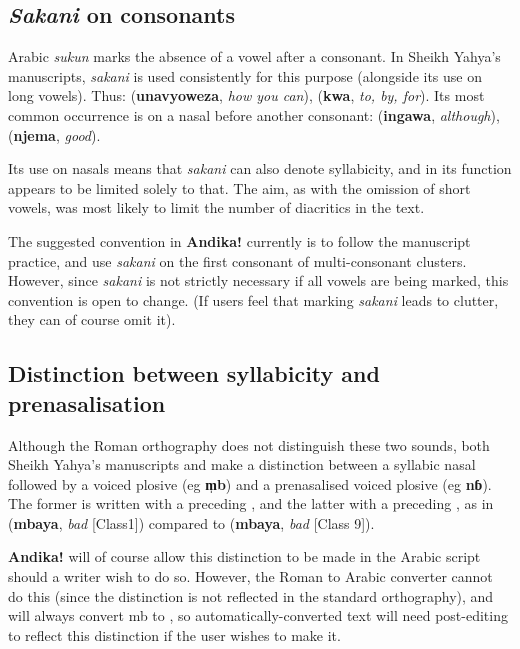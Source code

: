 \subsection{\textit{Sakani} on consonants}

Arabic \textit{sukun} marks the absence of a vowel after a consonant. In Sheikh Yahya's manuscripts, \textit{sakani} is used consistently for this purpose (alongside its use on long vowels). Thus:  (\textbf{unavyoweza}, \textit{how you can}),  (\textbf{kwa}, \textit{to, by, for}). Its most common occurrence is on a nasal before another consonant:  (\textbf{ingawa}, \textit{although}),  (\textbf{njema}, \textit{good}).

Its use on nasals means that \textit{sakani} can also denote syllabicity, and in \citet{Omar1997} its function appears to be limited solely to that. The aim, as with the omission of short vowels, was most likely to limit the number of diacritics in the text.

The suggested convention in \textbf{Andika!} currently is to follow the manuscript practice, and use \textit{sakani} on the first consonant of multi-consonant clusters. However, since \textit{sakani} is not strictly necessary if all vowels are being marked, this convention is open to change.  (If users feel that marking \textit{sakani} leads to clutter, they can of course omit it).

\subsection{Distinction between syllabicity and prenasalisation}

Although the Roman orthography does not distinguish these two sounds, both Sheikh Yahya's manuscripts and \citet{Omar1997} make a distinction between a syllabic nasal followed by a voiced plosive (eg \textbf{m̩b}) and a prenasalised voiced plosive (eg \textbf{nɓ}). The former is written with a preceding , and the latter with a preceding , as in  (\textbf{mbaya}, \textit{bad} [Class1]) compared to  (\textbf{mbaya}, \textit{bad} [Class 9]).

\textbf{Andika!} will of course allow this distinction to be made in the Arabic script should a writer wish to do so. However, the Roman to Arabic converter cannot do this (since the distinction is not reflected in the standard orthography), and will always convert mb to , so automatically-converted text will need post-editing to reflect this distinction if the user wishes to make it.
